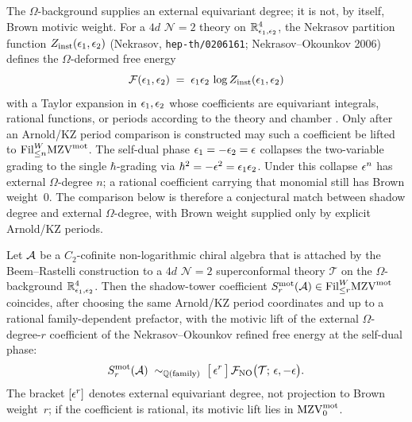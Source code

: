 The $\Omega$-background supplies an external equivariant degree; it is
not, by itself, Brown motivic weight. For a $4d$ $\mathcal N=2$ theory
on $\mathbb R^4_{\epsilon_1,\epsilon_2}$, the Nekrasov partition function
$Z_{\mathrm{inst}}(\epsilon_1,\epsilon_2)$
(Nekrasov, \texttt{hep-th/0206161}; Nekrasov--Okounkov 2006) defines
the $\Omega$-deformed free energy
\[
 \mathcal F(\epsilon_1,\epsilon_2)
 \;=\;
 \epsilon_1\epsilon_2\,\log Z_{\mathrm{inst}}(\epsilon_1,\epsilon_2)
\]
with a Taylor expansion in $\epsilon_1,\epsilon_2$ whose coefficients are
equivariant integrals, rational functions, or periods according to the
theory and chamber \cite{NakajimaYoshioka2003,ErnstromNaganoNakajima2015}.
Only after an Arnold/KZ period comparison is constructed may such a
coefficient be lifted to
$\mathrm{Fil}^W_{\le n}\mathrm{MZV}^{\mathrm{mot}}$. The self-dual phase
$\epsilon_1=-\epsilon_2=\epsilon$ collapses the two-variable grading to the single
$\hbar$-grading via $\hbar^2=-\epsilon^2=\epsilon_1\epsilon_2$. Under this collapse
$\epsilon^n$ has external $\Omega$-degree $n$; a rational coefficient
carrying that monomial still has Brown weight~$0$. The comparison below
is therefore a conjectural match between shadow degree and external
$\Omega$-degree, with Brown weight supplied only by explicit
Arnold/KZ periods.

\begin{conjecture}
\ClaimStatusConjectured
Let $\mathcal{A}$ be a $C_2$-cofinite non-logarithmic chiral algebra that
is attached by the Beem--Rastelli construction to a $4d$
$\mathcal{N}=2$ superconformal theory $\mathcal T$ on the
$\Omega$-background
$\mathbb{R}^4_{\epsilon_1,\epsilon_2}$. Then the shadow-tower coefficient
$S_r^{\mathrm{mot}}(\mathcal{A})\in\mathrm{Fil}^W_{\le r}\mathrm{MZV}^{\mathrm{mot}}$ coincides, after choosing
the same Arnold/KZ period coordinates and up to a rational
family-dependent prefactor, with the motivic lift of the external
$\Omega$-degree-$r$ coefficient of the Nekrasov--Okounkov refined free
energy at the self-dual phase:
\[
 S_r^{\mathrm{mot}}(\mathcal{A})
 \;\sim_{\mathbb{Q}(\mathrm{family})}\;
 \bigl[\,\epsilon^r\,\bigr]\,
 \mathcal F_{\mathrm{NO}}\bigl(\mathcal T;\,\epsilon,-\epsilon\bigr).
\]
The bracket $[\epsilon^r]$ denotes external equivariant degree, not
projection to Brown weight~$r$; if the coefficient is rational, its
motivic lift lies in $\mathrm{MZV}^{\mathrm{mot}}_0$.
\end{conjecture}

